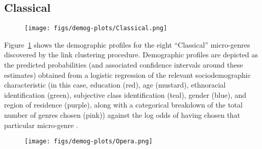 \subsection{Classical}

 \begin{figure}[ht!]
 \centering
 \texttt{[image: figs/demog-plots/Classical.png]}
 \caption{}
  \label{fig:classical}
 \end{figure}
 
Figure~\ref{fig:classical} shows the demographic profiles for the eight ``Classical'' micro-genres discovered by the link clustering procedure. Demographic profiles are depicted as the predicted probabilities (and associated confidence intervals around these estimates) obtained from a logistic regression of the relevant sociodemographic characteristic (in this case, education (red), age (mustard), ethnoracial identification (green), subjective class identification (teal), gender (blue), and region of residence (purple), along with a categorical breakdown of the total number of genres chosen (pink)) against the log odds of having chosen that particular micro-genre \citep{king_etal00}. 

 \begin{figure}[ht!]
 \centering
 \texttt{[image: figs/demog-plots/Opera.png]}
 \caption{}
  \label{fig:opera}
 \end{figure}

